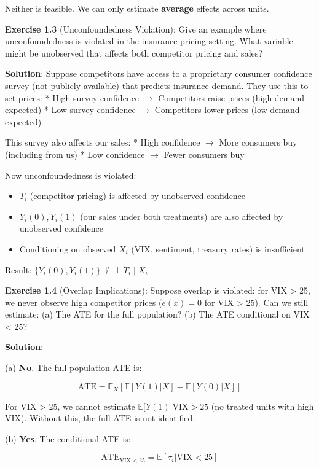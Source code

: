Neither is feasible. We can only estimate \textbf{average} effects
across units.

\textbf{Exercise 1.3} (Unconfoundedness Violation): Give an example
where unconfoundedness is violated in the insurance pricing setting.
What variable might be unobserved that affects both competitor pricing
and sales?

\textbf{Solution}: Suppose competitors have access to a proprietary
consumer confidence survey (not publicly available) that predicts
insurance demand. They use this to set prices: * High survey confidence
$\to$ Competitors raise prices (high demand expected) * Low survey
confidence $\to$ Competitors lower prices (low demand expected)

This survey also affects our sales: * High confidence $\to$ More consumers
buy (including from us) * Low confidence $\to$ Fewer consumers buy

Now unconfoundedness is violated:
\begin{itemize}
\item $T_i$ (competitor pricing) is affected by unobserved confidence
\item $Y_i(0), Y_i(1)$ (our sales under both treatments) are also affected by unobserved confidence
\item Conditioning on observed $X_i$ (VIX, sentiment, treasury rates) is insufficient
\end{itemize}

Result: \(\{Y_i(0), Y_i(1)\} \not\perp\!\!\!\perp T_i \mid X_i\)

\textbf{Exercise 1.4} (Overlap Implications): Suppose overlap is
violated: for VIX \textgreater{} 25, we never observe high competitor
prices (\(e(x) = 0\) for VIX \textgreater{} 25). Can we still estimate:
(a) The ATE for the full population? (b) The ATE conditional on VIX
\textless{} 25?

\textbf{Solution}:

(a) \textbf{No}. The full population ATE is:

\[\text{ATE} = \mathbb{E}_X[\mathbb{E}[Y(1) | X] - \mathbb{E}[Y(0) | X]]\]

For VIX \textgreater{} 25, we cannot estimate
\(\mathbb{E}[Y(1) | \text{VIX} > 25\) (no treated units with high
VIX). Without this, the full ATE is not identified.

(b) \textbf{Yes}. The conditional ATE is:

\[\text{ATE}_{\text{VIX} < 25} = \mathbb{E}[\tau_i | \text{VIX} < 25]\]

